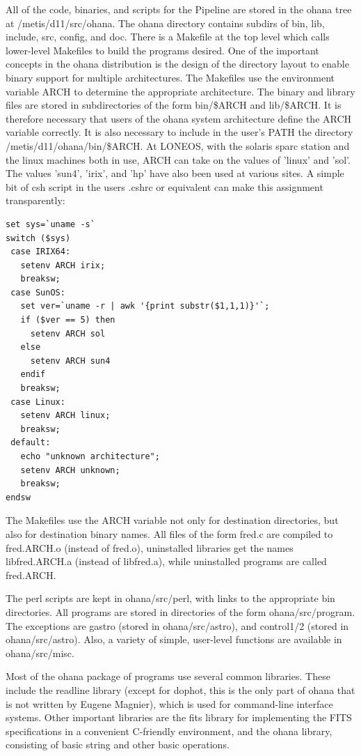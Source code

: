 \documentclass{article}
\begin{document}
All of the code, binaries, and scripts for the Pipeline are stored in
the ohana tree at /metis/d11/src/ohana.  The ohana directory contains
subdirs of bin, lib, include, src, config, and doc.  There is a
Makefile at the top level which calls lower-level Makefiles to build
the programs desired.  One of the important concepts in the ohana
distribution is the design of the directory layout to enable binary
support for multiple architectures.  The Makefiles use the environment
variable ARCH to determine the appropriate architecture.  The binary
and library files are stored in subdirectories of the form bin/\$ARCH
and lib/\$ARCH.  It is therefore necessary that users of the ohana
system architecture define the ARCH variable correctly.  It is also
necessary to include in the user's PATH the directory
/metis/d11/ohana/bin/\$ARCH.  At LONEOS,
with the solaris sparc station and the linux machines both in use,
ARCH can take on the values of 'linux' and 'sol'.  The values 'sun4',
'irix', and 'hp' have also been used at various sites.  A simple bit
of csh script in the users .cshrc or equivalent can make this
assignment transparently:

\begin{verbatim}
set sys=`uname -s` 
switch ($sys)
 case IRIX64:
   setenv ARCH irix;
   breaksw;
 case SunOS:
   set ver=`uname -r | awk '{print substr($1,1,1)}'`;
   if ($ver == 5) then
     setenv ARCH sol
   else 
     setenv ARCH sun4
   endif
   breaksw;
 case Linux:
   setenv ARCH linux;
   breaksw;
 default:
   echo "unknown architecture";
   setenv ARCH unknown;
   breaksw;
endsw
\end{verbatim}

The Makefiles use the ARCH variable not only for destination
directories, but also for destination binary names.  All files of the
form fred.c are compiled to fred.ARCH.o (instead of fred.o), 
uninstalled libraries get the names libfred.ARCH.a (instead of
libfred.a), while uninstalled programs are called fred.ARCH.  

The perl scripts are kept in ohana/src/perl, with links to the
appropriate bin directories.  All programs are stored in directories
of the form ohana/src/program.  The exceptions are gastro (stored in
ohana/src/astro), and control1/2 (stored in ohana/src/astro).  Also, a
variety of simple, user-level functions are available in
ohana/src/misc. 

Most of the ohana package of programs use several common libraries.
These include the readline library (except for dophot, this is the only
part of ohana that is not written by Eugene Magnier), which is used
for command-line interface systems.  Other important libraries are the
fits library for implementing the FITS specifications in a convenient
C-friendly environment, and the ohana library, consisting of basic
string and other basic operations.  
\end{document}
